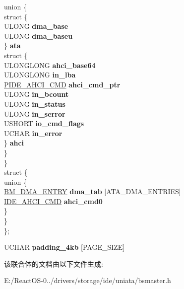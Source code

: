 \begin{DoxyCompactItemize}
\begin{tabbing}
\>\>union \{\\
\>\>\>struct \{\\
\>\>\>\>ULONG {\bfseries dma\_base}\\
\>\>\>\>ULONG {\bfseries dma\_baseu}\\
\>\>\>\} {\bfseries ata}\\
\>\>\>struct \{\\
\>\>\>\>ULONGLONG {\bfseries ahci\_base64}\\
\>\>\>\>ULONGLONG {\bfseries in\_lba}\\
\>\>\>\>\hyperlink{struct___i_d_e___a_h_c_i___c_m_d}{PIDE\_AHCI\_CMD} {\bfseries ahci\_cmd\_ptr}\\
\>\>\>\>ULONG {\bfseries in\_bcount}\\
\>\>\>\>ULONG {\bfseries in\_status}\\
\>\>\>\>ULONG {\bfseries in\_serror}\\
\>\>\>\>USHORT {\bfseries io\_cmd\_flags}\\
\>\>\>\>UCHAR {\bfseries in\_error}\\
\>\>\>\} {\bfseries ahci}\\
\>\>\} \\
\>\} \\
\mbox{\label{struct___a_t_a___r_e_q_1_1_0D1058_aa71f429b1710799637157e190e96817b}} 
\>struct \{\\
\mbox{\label{struct___a_t_a___r_e_q_1_1_0D1058_1_1_0D1062_ad3fbbcbf8aa05a98b5d7d2b4cb44f394}} 
\>\>union \{\\
\>\>\>\hyperlink{struct_b_m___d_m_a___e_n_t_r_y}{BM\_DMA\_ENTRY} {\bfseries dma\_tab} \mbox{[}ATA\_DMA\_ENTRIES\mbox{]}\\
\>\>\>\hyperlink{struct___i_d_e___a_h_c_i___c_m_d}{IDE\_AHCI\_CMD} {\bfseries ahci\_cmd0}\\
\>\>\} \\
\>\} \\
\}; \\

\end{tabbing}\item 
\mbox{\label{union___a_t_a___r_e_q_a4bc5c9c2d729e0230983f0c0c39a0194}} 
U\+C\+H\+AR {\bfseries padding\+\_\+4kb} \mbox{[}P\+A\+G\+E\+\_\+\+S\+I\+ZE\mbox{]}
\end{DoxyCompactItemize}


该联合体的文档由以下文件生成\+:\begin{DoxyCompactItemize}
\item 
E\+:/\+React\+O\+S-\/0../drivers/storage/ide/uniata/bsmaster.\+h\end{DoxyCompactItemize}
